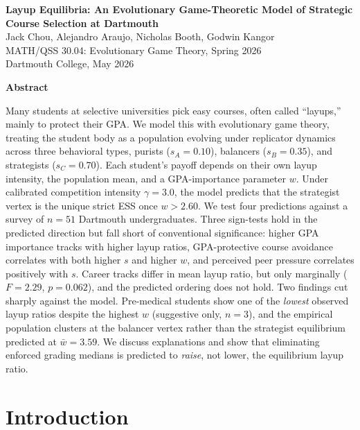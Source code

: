 \documentclass[12pt]{article}
\begin{document}
\begin{center}
  {\Large \textbf{Layup Equilibria: An Evolutionary Game-Theoretic Model of Strategic Course Selection at Dartmouth}}\\[10pt]
  {\normalsize Jack Chou, Alejandro Araujo, Nicholas Booth, Godwin Kangor}\\[2pt]
  {\normalsize MATH/QSS 30.04: Evolutionary Game Theory, Spring 2026\\
  Dartmouth College, May 2026}
\end{center}

\begin{center}\textbf{Abstract}\end{center}

\noindent
Many students at selective universities pick easy courses, often called
``layups,'' mainly to protect their GPA. We model this with evolutionary
game theory, treating the student body as a population evolving under
replicator dynamics across three behavioral types, purists
($s_A = 0.10$), balancers ($s_B = 0.35$), and strategists
($s_C = 0.70$). Each student's payoff depends on their own layup
intensity, the population mean, and a GPA-importance parameter $w$.
Under calibrated competition intensity $\gamma = 3.0$, the model
predicts that the strategist vertex is the unique strict ESS once
$w > 2.60$. We test four predictions against a survey of
$n = 51$ Dartmouth undergraduates. Three sign-tests hold in the
predicted direction but fall short of conventional significance:
higher GPA importance tracks with higher layup ratios, GPA-protective
course avoidance correlates with both higher $s$ and higher $w$, and
perceived peer pressure correlates positively with $s$. Career tracks
differ in mean layup ratio, but only marginally ($F = 2.29$,
$p = 0.062$), and the predicted ordering does not hold. Two findings
cut sharply against the model. Pre-medical students show one of the
\emph{lowest} observed layup ratios despite the highest $w$
(suggestive only, $n = 3$), and the empirical population clusters at
the balancer vertex rather than the strategist equilibrium predicted
at $\bar{w} = 3.59$. We discuss explanations and show that eliminating
enforced grading medians is predicted to \emph{raise}, not lower, the
equilibrium layup ratio.

\section{Introduction}
\end{document}
